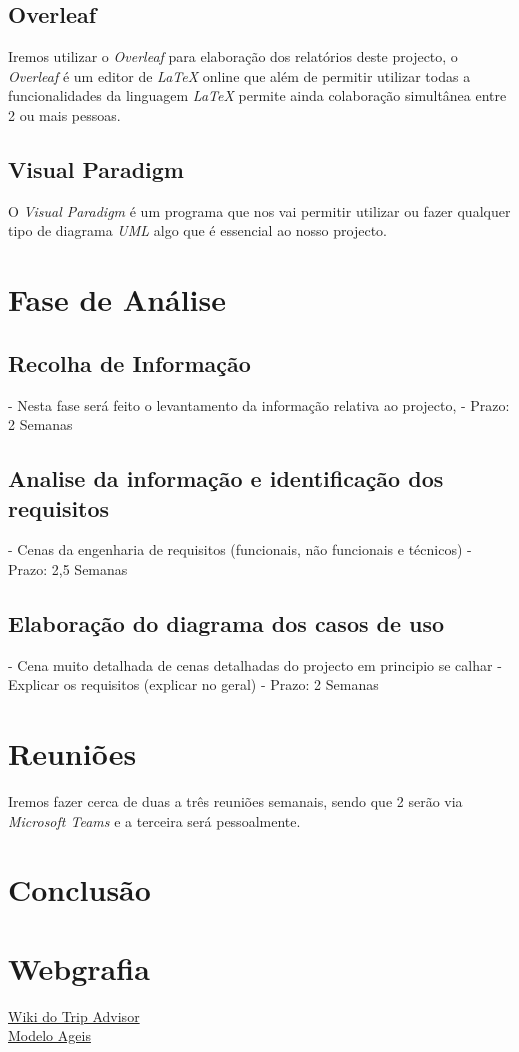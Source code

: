 \documentclass[a4paper]{article}
\begin{document}
\subsection{Overleaf}
Iremos utilizar o \textit{Overleaf} para elaboração dos relatórios deste projecto, o \textit{Overleaf} é um editor de \textit{LaTeX} online que além de permitir utilizar todas a funcionalidades da linguagem \textit{LaTeX} permite ainda colaboração simultânea entre 2 ou mais pessoas.

\subsection{Visual Paradigm}
O \textit{Visual Paradigm} é um programa que nos vai permitir utilizar ou fazer qualquer tipo de diagrama \textit{UML} algo que é essencial ao nosso projecto. 
\newpage

\section{Fase de Análise}
\subsection{Recolha de Informação}
 - Nesta fase será feito o levantamento da informação relativa ao projecto, 
 - Prazo: 2 Semanas
    
\subsection{Analise da informação e identificação dos requisitos}
- Cenas da engenharia de requisitos (funcionais, não funcionais e técnicos)
- Prazo: 2,5 Semanas

\subsection{Elaboração do diagrama dos casos de uso}
- Cena muito detalhada de cenas detalhadas do projecto em principio se calhar
- Explicar os requisitos (explicar no geral)
- Prazo: 2 Semanas

\section{Reuniões}
Iremos fazer cerca de duas a três reuniões semanais, sendo que 2 serão via \textit{Microsoft Teams} e a terceira será pessoalmente.

\newpage
\section{Conclusão}

\section{Webgrafia}
\href{https://pt.wikipedia.org/wiki/TripAdvisor}{Wiki do Trip Advisor}\\
\href{https://www.projectbuilder.com.br/blog/quais-sao-os-principais-tipos-de-metodos-ageis/}{Modelo Ageis}



\end{document}
